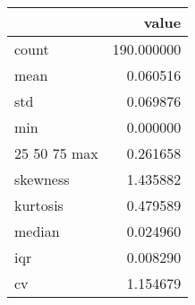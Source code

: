 \begin{tabular}{lr}
\toprule
 & value \\
\midrule
count & 190.000000 \\
mean & 0.060516 \\
std & 0.069876 \\
min & 0.000000 \\
25%
50%
75%
max & 0.261658 \\
skewness & 1.435882 \\
kurtosis & 0.479589 \\
median & 0.024960 \\
iqr & 0.008290 \\
cv & 1.154679 \\
\bottomrule
\end{tabular}
